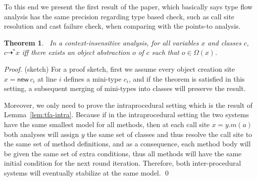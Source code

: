 \documentclass{llncs}
\newtheorem{Theorem}{Theorem}
\newcommand{\keyword}[1]{\mathsf{#1}}
\newcommand{\kwnew}[0]{\keyword{new}}
\newcommand{\VPT}{\Omega}
\newcommand{\Class}{\mathcal{C}}
\newcommand{\Field}{\mathcal{F}}
\newcommand{\tflow}{\dashrightarrow}
\newcommand{\hflow}{\longrightarrow}
\newcommand{\lhflow}[1]{\stackrel{#1}{\hflow}}
\newcommand\set[1]{\{#1\}}
\newcommand\power{\mathcal{P}}
\begin{document}
To this end we present the first result of the paper, which basically says type flow analysis has the same precision regarding type based check, such as call site resolution and cast failure check, when comparing with the points-to analysis.
\begin{Theorem}~\label{thm:tfa}
  In a context-insensitive analysis, for all variables $x$ and classes $c$, $c\tflow^*x$ iff there exists an object abstraction $o$ of $c$ such that $o\in\VPT(x)$.
\end{Theorem}
\begin{proof} (sketch)
For a proof sketch, first we assume every object creation site $x = \kwnew\ c_i$ at line $i$ defines a mini-type $c_i$, and if the theorem is satisfied in this setting, a subsequent merging of mini-types into classes will preserve the result.

Moreover, we only need to prove the intraprocedural setting which is the result of Lemma~\ref{lem:tfa-intra}. Because if in the intraprocedural setting the two systems have the same smallest model for all methods, then at each call site $x=y.m(a)$ both analyses will assign $y$ the same set of classes and thus resolve the call site to the same set of method definitions, and as a consequence, each method body will be given the same set of extra conditions, thus all methods will have the same initial condition for the next round iteration. Therefore, both inter-procedural systems will eventually stabilize at the same model. \qed
\end{proof}

\end{document}
